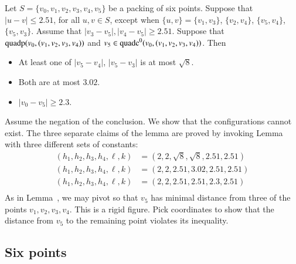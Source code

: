 \begin{tarskidata}
\begin{tarski}
\begin{lemma}
Let $S=\{v_0,v_1,v_2,v_3,v_4,v_5\}$ be a packing of six points.  
Suppose that $|u-v|\le 2.51$, for all $u,v\in S$, 
except
when $\{u,v\}=\{v_1,v_3\}$, $\{v_2,v_4\}$, $\{v_5,v_4\}$,
$\{v_5,v_3\}$.  
Assume that $|v_3-v_5|,|v_4-v_5|\ge2.51$.
Suppose that ${\operatorname{quadp}}(v_0,(v_1,v_2,v_3,v_4))$
and $v_5\in{\operatorname{quadc}}^0(v_0,(v_1,v_2,v_3,v_4))$.
Then
\begin{itemize}
  \item At least one of $|v_5-v_4|$, $|v_5-v_3|$ is at most $\sqrt8$.
    \item Both are at most $3.02$.
  \item $|v_0-v_5|\ge 2.3$.
\end{itemize}
\end{lemma}

\begin{proved}  Assume the negation of the conclusion.  We show that the
configurations cannot exist.  The three separate claims of the lemma are proved by
invoking Lemma~ with three different sets of constants:
  $$
  \begin{array}{lll}
        (h_1,h_2,h_3,h_4,\ell,k) &= (2,2,\sqrt8,\sqrt8,2.51,2.51)\\
    (h_1,h_2,h_3,h_4,\ell,k) &= (2,2,2.51,3.02,2.51,2.51)\\
    (h_1,h_2,h_3,h_4,\ell,k) &= (2,2,2.51,2.51,2.3,2.51)\\
    \end{array}
  $$
As in Lemma~, we may pivot  so that
$v_5$ has minimal distance from three of the points $v_1,v_2,v_3,v_4$.
This is a rigid figure.  
Pick coordinates to show that the
distance from $v_5$ to the remaining point violates its inequality.
\swallowed\end{proved}
\end{tarski}




\begin{tarski}
\section{Six points}



\end{tarski}
\end{tarskidata}
